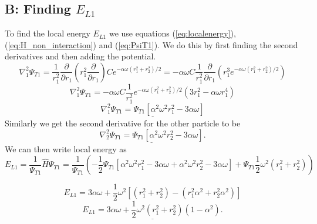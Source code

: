 \documentclass[norsk,a4paper,12pt]{article}
\begin{document}
\subsection{B: Finding $E_{L1}$}
To find the local energy $E_{L1}$ we use equations (\ref{eq:localenergy}), (\ref{eq:H_non_interaction}) and (\ref{eq:PsiT1}). We do this by first finding the second derivatives and then adding the potential.
$$\nabla_1^2 \Psi_{T1} = \frac{1}{r_1^2}\frac{\partial}{\partial r_1}(r_1^2 \frac{\partial}{\partial r_1})Ce^{-\alpha \omega (r_1^2+r_2^2)/2} = -\alpha \omega C\frac{1}{r_1^2}\frac{\partial}{\partial r_1}(r_1^3e^{-\alpha\omega(r_1^2+r_2^2)/2})$$
$$\nabla_1^2 \Psi_{T1} = -\alpha \omega C\frac{1}{r_1^2}e^{-\alpha \omega (r_1^2+r_2^2)/2}(3r_1^2 - \alpha \omega r_1^4)$$
$$\underline{\nabla_1^2 \Psi_{T1} = \Psi_{T1}[\alpha ^2\omega ^2r_1^2 - 3\alpha \omega]}$$
Similarly we get the second derivative for the other particle to be
$$\underline{\nabla_2^2 \Psi_{T1} = \Psi_{T1}[\alpha ^2\omega ^2r_2^2 - 3\alpha \omega]}.$$
We can then write local energy as
$$E_{L1} = \frac{1}{\Psi_{T1}}\hat{H}\Psi_{T1} = \frac{1}{\Psi_{T1}}\left(-\frac{1}{2}\Psi_{T1}[\alpha ^2\omega ^2r_1^2 - 3\alpha \omega + \alpha ^2\omega ^2r_2^2 - 3\alpha \omega] + \Psi_{T1}\frac{1}{2} \omega^2(r_1^2+r_2^2)\right)$$

$$E_{L1} = 3\alpha \omega +\frac{1}{2}\omega^2\left[(r_1^2+r_2^2) - (r_1^2\alpha^2 + r_2^2\alpha^2)\right]$$
$$\underline{E_{L1} = 3\alpha \omega + \frac{1}{2}\omega^2(r_1^2+r_2^2)(1-\alpha^2).}$$
\end{document}
